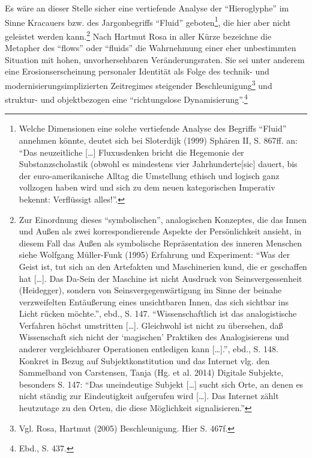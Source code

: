 \documentclass[a4paper,
fontsize=11pt,
oneside,
numbers=noperiodatend,
parskip=half-,
bibliography=totoc,
final
]{scrartcl}
\begin{document}
Es wäre an dieser Stelle sicher eine vertiefende Analyse der
\enquote{Hieroglyphe} im Sinne Kracauers bzw. des Jargonbegriffs
\enquote{Fluid} geboten\footnote{Welche Dimensionen eine solche
  vertiefende Analyse des Begriffs \enquote{Fluid} annehmen könnte,
  deutet sich bei Sloterdijk (1999) Sphären II, S. 867ff. an:
  \enquote{Das neuzeitliche {[}\ldots{}{]} Fluxusdenken bricht die
  Hegemonie der Substanzscholastik (obwohl es mindestens vier
  Jahrhunderte{[}sic{]} dauert, bis der euro-amerikanische Alltag die
  Umstellung ethisch und logisch ganz vollzogen haben wird und sich zu
  dem neuen kategorischen Imperativ bekennt: Verflüssigt alles!}.}, die
hier aber nicht geleistet werden kann.\footnote{Zur Einordnung dieses
  \enquote{symbolischen}, analogischen Konzeptes, die das Innen und
  Außen als zwei korrespondierende Aspekte der Persönlichkeit ansieht,
  in diesem Fall das Außen als symbolische Repräsentation des inneren
  Menschen siehe Wolfgang Müller-Funk (1995) Erfahrung und Experiment:
  \enquote{Was der Geist ist, tut sich an den Artefakten und
  Maschinerien kund, die er geschaffen hat {[}\ldots{}{]}. Das Da-Sein
  der Maschine ist nicht Ausdruck von Seinsvergessenheit (Heidegger),
  sondern von Seinsvergegenwärtigung im Sinne der beinahe verzweifelten
  Entäußerung eines unsichtbaren Innen, das sich sichtbar ins Licht
  rücken möchte.}, ebd., S. 147. \enquote{Wissenschaftlich ist das
  analogistische Verfahren höchst umstritten {[}\ldots{}{]}. Gleichwohl
  ist nicht zu übersehen, daß Wissenschaft sich nicht der
  \enquote{magischen} Praktiken des Analogisierens und anderer
  vergleichbarer Operationen entledigen kann {[}\ldots{}{]}.}, ebd., S.
  148. Konkret in Bezug auf Subjektkonstitution und das Internet vlg.
  den Sammelband von Carstensen, Tanja (Hg. et al. 2014) Digitale
  Subjekte, besonders S. 147: \enquote{Das uneindeutige Subjekt
  {[}\ldots{}{]} sucht sich Orte, an denen es nicht ständig zur
  Eindeutigkeit aufgerufen wird {[}\ldots{}{]}. Das Internet zählt
  heutzutage zu den Orten, die diese Möglichkeit signalisieren.}} Nach
Hartmut Rosa in aller Kürze bezeichne die Metapher des \enquote{flows}
oder \enquote{fluids} die Wahrnehmung einer eher unbestimmten Situation
mit hohen, unvorhersehbaren Veränderungsraten. Sie sei unter anderem
eine Erosionserscheinung personaler Identität als Folge des technik- und
modernisierungsimplizierten Zeitregimes steigender
Beschleunigung\footnote{Vgl. Rosa, Hartmut (2005) Beschleunigung. Hier
  S. 467f.} und struktur- und objektbezogen eine \enquote{richtungslose
Dynamisierung}.\footnote{Ebd., S. 437.}
\end{document}
